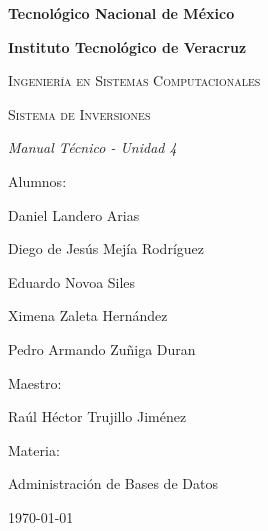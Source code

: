 \begin{titlepage}
	\centering
	{\bfseries\LARGE Tecnol\'ogico Nacional de M\'exico \par}
	{\bfseries\LARGE Instituto Tecnol\'ogico de Veracruz \par}
	\vspace{1cm}
	{\scshape\LARGE Ingenier\'ia en Sistemas Computacionales \par}
	
	\vfill
	
	{\scshape\huge Sistema de Inversiones\par}
	{\itshape\LARGE Manual T\'ecnico - Unidad 4\par}
	
	\vfill
	
	{\Large Alumnos:\par}
	{\Large Daniel Landero Arias\par}
	{\Large Diego de Jes\'us Mej\'ia Rodr\'iguez\par}
	{\Large Eduardo Novoa Siles\par}
	{\Large Ximena Zaleta Hern\'andez\par}
	{\Large Pedro Armando Zuñiga Duran\par}
	\vspace{0.5cm}
	{\Large Maestro:\par}
	{\Large Ra\'ul H\'ector Trujillo Jim\'enez\par}
	{\Large Materia:\par}
	{\Large Administraci\'on de Bases de Datos\par}
	
	\vfill
	
	{\Large \today \par}
\end{titlepage}